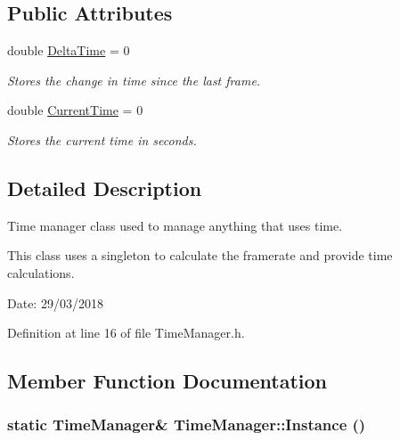 \subsection*{Public Attributes}
\begin{CompactItemize}
\item 
\hypertarget{class_time_manager_29ebf2fa98a175c85dce334edea936e5}{
double \hyperlink{class_time_manager_29ebf2fa98a175c85dce334edea936e5}{DeltaTime} = 0}
\label{class_time_manager_29ebf2fa98a175c85dce334edea936e5}

\begin{CompactList}\small\item\em Stores the change in time since the last frame. \item\end{CompactList}\item 
\hypertarget{class_time_manager_b015656db2574db7be945e10efa94309}{
double \hyperlink{class_time_manager_b015656db2574db7be945e10efa94309}{CurrentTime} = 0}
\label{class_time_manager_b015656db2574db7be945e10efa94309}

\begin{CompactList}\small\item\em Stores the current time in seconds. \item\end{CompactList}\end{CompactItemize}


\subsection{Detailed Description}
Time manager class used to manage anything that uses time. 

This class uses a singleton to calculate the framerate and provide time calculations.

\begin{Desc}
\item[Date:]29/03/2018 \end{Desc}


Definition at line 16 of file TimeManager.h.

\subsection{Member Function Documentation}
\hypertarget{class_time_manager_9bb9e5390526b32783b94adb728604fa}{
\subsubsection[Instance]{\setlength{\rightskip}{0pt plus 5cm}static {\bf TimeManager}\& TimeManager::Instance ()}}
\label{class_time_manager_9bb9e5390526b32783b94adb728604fa}


